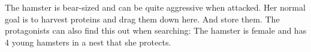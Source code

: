 \begin{npcBox}[title=Hamster]
    \begin{consequences}
    \item {}
    \item {}
    \item {}
    \end{consequences}

    \begin{npcDescription}
    The hamster is bear-sized and can be quite aggressive when attacked. Her normal goal is to harvest proteins and drag them down here. And store them. The protagonists can also find this out when searching: The hamster is female and has 4 young hamsters in a nest that she protects.
    \end{npcDescription}

\end{npcBox}


